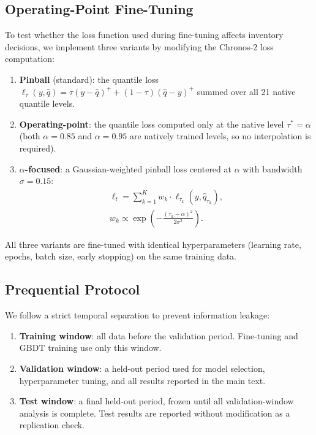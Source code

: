 \documentclass[msom,dblanonrev]{informs4}
\begin{document}
\subsection{Operating-Point Fine-Tuning}\label{subsec:da_ft}

To test whether the loss function used during fine-tuning affects inventory decisions, we implement three variants by modifying the Chronos-2 loss computation:

\begin{enumerate}
\item \textbf{Pinball} (standard): the quantile loss $\ell_\tau(y, \hat{q}) = \tau(y - \hat{q})^+ + (1-\tau)(\hat{q} - y)^+$ summed over all 21 native quantile levels.
\item \textbf{Operating-point}: the quantile loss computed only at the native level $\tau^* = \alpha$ (both $\alpha = 0.85$ and $\alpha = 0.95$ are natively trained levels, so no interpolation is required).
\item \textbf{$\alpha$-focused}: a Gaussian-weighted pinball loss centered at $\alpha$ with bandwidth $\sigma = 0.15$:
    \begin{align*} 
    \ell_{\text{f}} = \sum_{k=1}^{K} w_k \cdot \ell_{\tau_k}(y, \hat{q}_{\tau_k}), \\
    w_k \propto \exp\!\left(-\frac{(\tau_k - \alpha)^2}{2\sigma^2}\right).
    \end{align*}
\end{enumerate}

All three variants are fine-tuned with identical hyperparameters (learning rate, epochs, batch size, early stopping) on the same training data.

\subsection{Prequential Protocol}

We follow a strict temporal separation to prevent information leakage:
\begin{enumerate}
\item \textbf{Training window}: all data before the validation period.
  Fine-tuning and GBDT training use only this window.
\item \textbf{Validation window}: a held-out period used for model selection, hyperparameter tuning, and all results reported in the main text.
\item \textbf{Test window}: a final held-out period, frozen until all validation-window analysis is complete.
  Test results are reported without modification as a replication check.
\end{enumerate}
\end{document}
